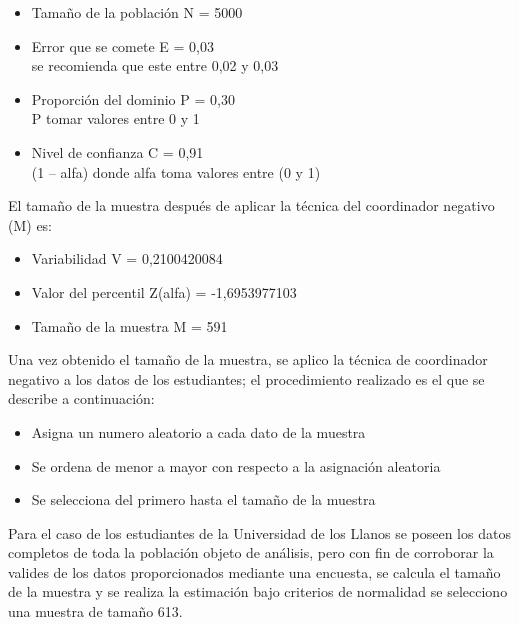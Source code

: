 \documentclass[conference]{IEEEtran}\usepackage[]{graphicx}\usepackage[]{color}
\begin{document}
\begin{itemize}
	\begin{itemize}
		\item Tamaño de la población 	N = 5000	
		\item Error que se comete		E = 0,03	\\se recomienda que este entre 0,02 y 0,03
		\item Proporción del dominio	P = 0,30	\\P tomar valores entre 0 y 1
		\item Nivel de confianza		C = 0,91	\\(1 – alfa) donde alfa toma valores entre (0 y 1)
	\end{itemize}
	\bigskip
  	  	El tamaño de la muestra después de aplicar la técnica del coordinador negativo (M) es:
  	\bigskip  	
  	\begin{itemize}
  		\item Variabilidad			V = 0,2100420084
	  	\item Valor del percentil 	Z(alfa) = -1,6953977103
		\item Tamaño de la muestra 	M = 591  	
  	\end{itemize}
  	\bigskip  	
  	Una vez obtenido el tamaño de la muestra, se aplico la técnica de coordinador negativo a los datos de los estudiantes; el procedimiento realizado es el que se describe a continuación:
  	\bigskip
  	\begin{itemize}
  		\item Asigna un numero aleatorio a cada dato de la muestra
		\item Se ordena de menor a mayor con respecto a la asignación aleatoria 
		\item Se selecciona del primero hasta el tamaño de la muestra  
  	 \end{itemize}
  	\bigskip  		
  	Para el caso de los estudiantes de la Universidad de los Llanos se poseen los datos completos de toda la población objeto de análisis, pero con fin de corroborar la valides de los datos proporcionados mediante una encuesta, se calcula el tamaño de la muestra y se realiza la estimación bajo criterios de normalidad se selecciono una muestra de tamaño 613.
  	  	
   
		 

\end{itemize}
\end{document}
